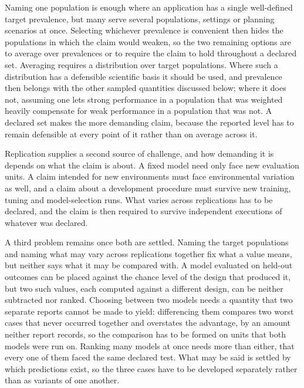 \documentclass[11pt]{article}
\theoremstyle{remark}
\begin{document}
Naming one population is enough where an application has a single well-defined target prevalence, but many serve several populations, settings or planning scenarios at once. Selecting whichever prevalence is convenient then hides the populations in which the claim would weaken, so the two remaining options are to average over prevalences or to require the claim to hold throughout a declared set. Averaging requires a distribution over target populations. Where such a distribution has a defensible scientific basis it should be used, and prevalence then belongs with the other sampled quantities discussed below; where it does not, assuming one lets strong performance in a population that was weighted heavily compensate for weak performance in a population that was not. A declared set makes the more demanding claim, because the reported level has to remain defensible at every point of it rather than on average across it.

Replication supplies a second source of challenge, and how demanding it is depends on what the claim is about. A fixed model need only face new evaluation units. A claim intended for new environments must face environmental variation as well, and a claim about a development procedure must survive new training, tuning and model-selection runs. What varies across replications has to be declared, and the claim is then required to survive independent executions of whatever was declared.

A third problem remains once both are settled. Naming the target populations and naming what may vary across replications together fix what a value means, but neither says what it may be compared with. A model evaluated on held-out outcomes can be placed against the chance level of the design that produced it, but two such values, each computed against a different design, can be neither subtracted nor ranked. Choosing between two models needs a quantity that two separate reports cannot be made to yield: differencing them compares two worst cases that never occurred together and overstates the advantage, by an amount neither report records, so the comparison has to be formed on units that both models were run on. Ranking many models at once needs more than either, that every one of them faced the same declared test. What may be said is settled by which predictions exist, so the three cases have to be developed separately rather than as variants of one another.
\end{document}
